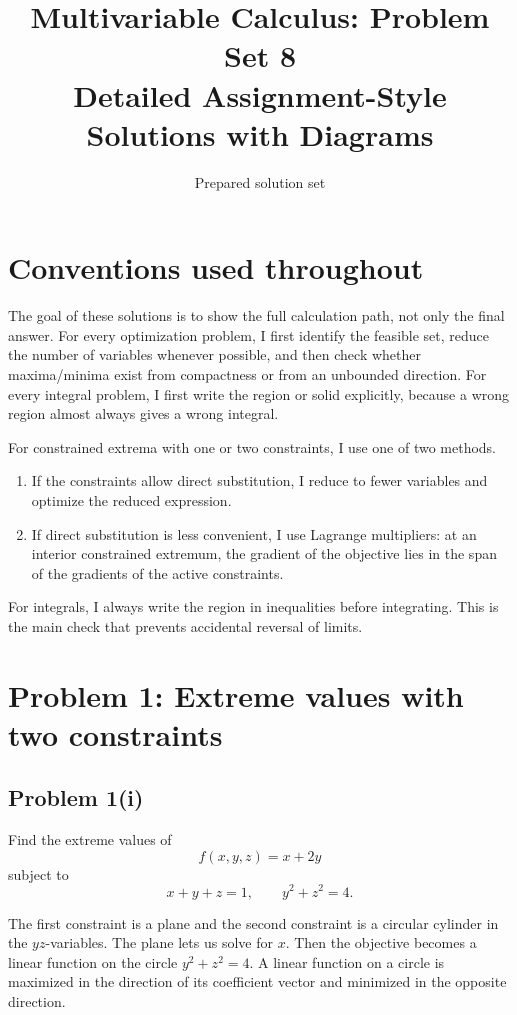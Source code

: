 \documentclass[11pt,a4paper]{article}
\title{\textbf{Multivariable Calculus: Problem Set 8}\\Detailed Assignment-Style Solutions with Diagrams}
\author{Prepared solution set}
\date{}
\begin{document}
\maketitle
\tableofcontents
\newpage

\section*{Conventions used throughout}
The goal of these solutions is to show the full calculation path, not only the final answer.  For every optimization problem, I first identify the feasible set, reduce the number of variables whenever possible, and then check whether maxima/minima exist from compactness or from an unbounded direction.  For every integral problem, I first write the region or solid explicitly, because a wrong region almost always gives a wrong integral.

\begin{methodbox}
For constrained extrema with one or two constraints, I use one of two methods.
\begin{enumerate}[label=\arabic*.]
\item If the constraints allow direct substitution, I reduce to fewer variables and optimize the reduced expression.
\item If direct substitution is less convenient, I use Lagrange multipliers: at an interior constrained extremum, the gradient of the objective lies in the span of the gradients of the active constraints.
\end{enumerate}
For integrals, I always write the region in inequalities before integrating.  This is the main check that prevents accidental reversal of limits.
\end{methodbox}

\section{Problem 1: Extreme values with two constraints}

\subsection{Problem 1(i)}
Find the extreme values of
\[
 f(x,y,z)=x+2y
\]
subject to
\[
 x+y+z=1,\qquad y^2+z^2=4.
\]

\begin{methodbox}
The first constraint is a plane and the second constraint is a circular cylinder in the \(yz\)-variables.  The plane lets us solve for \(x\).  Then the objective becomes a linear function on the circle \(y^2+z^2=4\).  A linear function on a circle is maximized in the direction of its coefficient vector and minimized in the opposite direction.
\end{methodbox}
\end{document}
